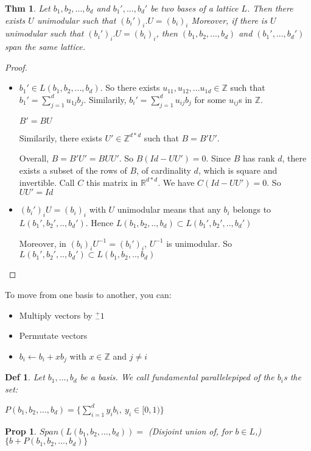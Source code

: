 \documentclass[11pt]{article}
\newtheorem{definition}{Def}
\newtheorem{theorem}{Thm}
\newtheorem{proposition}{Prop}
\begin{document}
\begin{theorem}
Let $b_1, b_2,...,b_d$ and $b_1',...,b_d'$ be two bases of a lattice $L$.
Then there exists $U$ unimodular such that $(b_i')_i . U=(b_i)_i$
Moreover, if there is $U$ unimodular such that $(b_i')_i . U=(b_i)_i$, then $(b_1,b_2,...,b_d)$ and $(b_1',...,b_d')$ span the same lattice.
\end{theorem}

\begin{proof}
\begin{itemize}
\item $b_1' \in L(b_1,b_2,...,b_d)$. So there exists  $u_{1 1},u_{1 2},...u_{1 d} \in \mathbb{Z}$ such that $b_1'= \sum_{j=1}^d u_{1 j} b_j$. Similarily, $b_i'=  \sum_{j=1}^d u_{i j} b_j$ for some $u_{i j}$s in $\mathbb{Z}$.

$B' = B U$ 

Similarily, there exists $U' \in \mathbb{Z}^{d*d}$ such that $B = B' U'$.

Overall, $B= B' U' = B U U'$. So $B(Id-U U')=0$.
Since $B$ has rank $d$, there exists a subset of the rows of $B$, of cardinality $d$, which is square and invertible. Call $C$ this matrix in $\mathbb{R}^{d*d}$. We have $C(Id-U U')=0$. So $U U'=Id$
\item $(b_i')_i U = (b_i)_i$ with $U$ unimodular means that any $b_i$ belongs to $L(b_1',b_2',..,b_d')$. Hence $L(b_1,b_2,..,b_d) \subset L(b_1',b_2',..,b_d')$

Moreover, in $(b_i)_i U^{-1} = (b_i')_i$, $U^{-1}$ is unimodular. So $L(b_1',b_2',..,b_d') \subset L(b_1,b_2,..,b_d)$
\end{itemize}
\end{proof}

To move from one basis to another, you can:
\begin{itemize}
\item Multiply vectors by $^+_- 1$
\item Permutate vectors
\item $b_i \leftarrow b_i + x b_j$ with $x \in \mathbb{Z}$ and $j \neq i$ 
\end{itemize}

\begin{definition}
Let $b_1,...,b_d$ be a basis. We call fundamental parallelepiped of the $b_i$s the set:

$P(b_1,b_2,...,b_d)=\{\sum^d_{i=1} y_i b_i, \ y_i \in [0,1) \}$
\end{definition}

\begin{proposition}
$Span(L(b_1,b_2,...,b_d))=$ (Disjoint union of, for $b \in L$,) $\{ b+P(b_1,b_2,...,b_d) \}$
\end{proposition}
\end{document}
